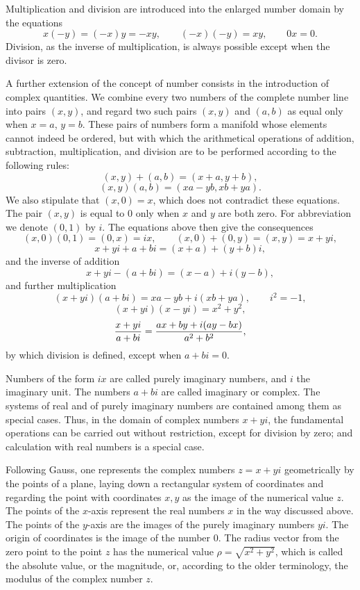 \documentclass[11pt]{article}
\begin{document}
Multiplication and division are introduced into the enlarged number domain by the equations
\[
 x(-y)=(-x)y=-xy,
 \qquad
 (-x)(-y)=xy,
 \qquad
 0x=0.
\]
Division, as the inverse of multiplication, is always possible except when the divisor is zero.

A further extension of the concept of number consists in the introduction of complex quantities. We combine every two numbers of the complete number line into pairs $(x,y)$, and regard two such pairs $(x,y)$ and $(a,b)$ as equal only when $x=a$, $y=b$. These pairs of numbers form a manifold whose elements cannot indeed be ordered, but with which the arithmetical operations of addition, subtraction, multiplication, and division are to be performed according to the following rules:
\[
 (x,y)+(a,b)=(x+a,y+b),
\]
\[
 (x,y)(a,b)=(xa-yb,xb+ya).
\]
We also stipulate that $(x,0)=x$, which does not contradict these equations. The pair $(x,y)$ is equal to $0$ only when $x$ and $y$ are both zero. For abbreviation we denote $(0,1)$ by $i$. The equations above then give the consequences
\[
 (x,0)(0,1)=(0,x)=ix,
 \qquad
 (x,0)+(0,y)=(x,y)=x+yi,
\]
\[
 x+yi+a+bi=(x+a)+(y+b)i,
\]
and the inverse of addition
\[
 x+yi-(a+bi)=(x-a)+i(y-b),
\]
and further multiplication
\[
 (x+yi)(a+bi)=xa-yb+i(xb+ya),
 \qquad i^2=-1,
\]
\[
 (x+yi)(x-yi)=x^2+y^2,
\]
\[
 {x+yi\over a+bi}={ax+by+i(ay-bx)\over a^2+b^2},
\]
by which division is defined, except when $a+bi=0$.

Numbers of the form $ix$ are called purely imaginary numbers, and $i$ the imaginary unit. The numbers $a+bi$ are called imaginary or complex. The systems of real and of purely imaginary numbers are contained among them as special cases. Thus, in the domain of complex numbers $x+yi$, the fundamental operations can be carried out without restriction, except for division by zero; and calculation with real numbers is a special case.

Following Gauss, one represents the complex numbers $z=x+yi$ geometrically by the points of a plane, laying down a rectangular system of coordinates and regarding the point with coordinates $x,y$ as the image of the numerical value $z$. The points of the $x$-axis represent the real numbers $x$ in the way discussed above. The points of the $y$-axis are the images of the purely imaginary numbers $yi$. The origin of coordinates is the image of the number $0$. The radius vector from the zero point to the point $z$ has the numerical value $\rho=\sqrt{x^2+y^2}$, which is called the absolute value, or the magnitude, or, according to the older terminology, the modulus of the complex number $z$.
\end{document}

